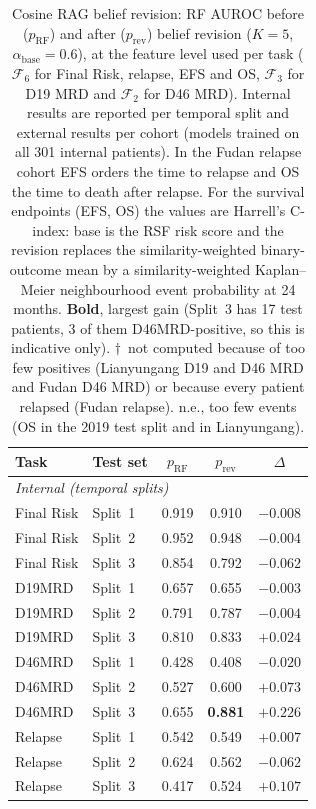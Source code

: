 \documentclass[pdflatex,sn-nature]{sn-jnl}
\begin{document}
\begin{appendices}
\begin{table}[ht]
\caption{Cosine RAG belief revision: RF AUROC before ($p_\text{RF}$) and
after ($p_\text{rev}$) belief revision ($K=5$, $\alpha_\text{base}=0.6$),
at the feature level used per task ($\mathcal{F}_6$ for Final Risk,
relapse, EFS and OS, $\mathcal{F}_3$ for D19 MRD and $\mathcal{F}_2$ for
D46 MRD). Internal results are reported per temporal split and
external results per cohort (models trained on all 301 internal
patients). In the Fudan relapse cohort EFS orders the time to relapse
and OS the time to death after relapse.
For the survival endpoints (EFS, OS) the values are Harrell's C-index:
base is the RSF risk score and the revision replaces the
similarity-weighted binary-outcome mean by a similarity-weighted
Kaplan--Meier neighbourhood event probability at 24 months.
\textbf{Bold}, largest gain (Split~3 has 17 test patients, 3 of them
D46MRD-positive, so this is indicative only). $\dagger$~not computed
because of too few positives (Lianyungang D19 and D46 MRD and Fudan D46
MRD) or because every patient relapsed (Fudan relapse). n.e., too few
events (OS in the 2019 test split and in Lianyungang).}
\label{tab:belief_revision}
\centering
\small
\setlength{\tabcolsep}{7pt}
\begin{tabular}{@{}ll ccc@{}}
\toprule
\textbf{Task} & \textbf{Test set} & $p_\text{RF}$ & $p_\text{rev}$ & \textbf{$\Delta$} \\
\midrule
\multicolumn{5}{l}{\textit{Internal (temporal splits)}} \\
Final Risk & Split~1 & 0.919 & 0.910 & $-0.008$ \\
Final Risk & Split~2 & 0.952 & 0.948 & $-0.004$ \\
Final Risk & Split~3 & 0.854 & 0.792 & $-0.062$ \\
D19MRD & Split~1 & 0.657 & 0.655 & $-0.003$ \\
D19MRD & Split~2 & 0.791 & 0.787 & $-0.004$ \\
D19MRD & Split~3 & 0.810 & 0.833 & $+0.024$ \\
D46MRD & Split~1 & 0.428 & 0.408 & $-0.020$ \\
D46MRD & Split~2 & 0.527 & 0.600 & $+0.073$ \\
D46MRD & Split~3 & 0.655 & \textbf{0.881} & $\mathbf{+0.226}$ \\
Relapse & Split~1 & 0.542 & 0.549 & $+0.007$ \\
Relapse & Split~2 & 0.624 & 0.562 & $-0.062$ \\
Relapse & Split~3 & 0.417 & 0.524 & $+0.107$ \\

\end{tabular}
\end{table}
\end{appendices}
\end{document}
